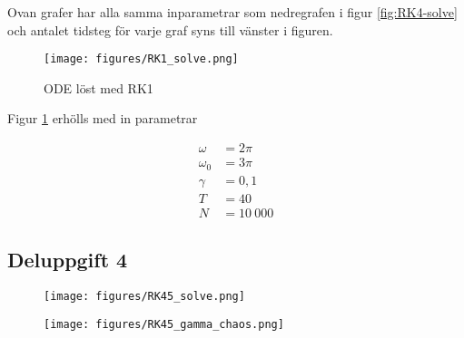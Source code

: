 \documentclass[12pt]{article}
\begin{document}
Ovan grafer har alla samma inparametrar som nedregrafen i figur \ref{fig:RK4-solve} och antalet tidsteg för varje graf syns till vänster i figuren.

\begin{figure}[H]
    \begin{small}
        \begin{center}
            \texttt{[image: figures/RK1\_solve.png]}
        \end{center}
        \caption{ODE löst med RK1}
        \label{fig:RK1-solve}
    \end{small}
\end{figure}

Figur \ref{fig:RK1-solve} erhölls med in parametrar

\begin{align*}
    \omega &= 2 \pi\\
    \omega_0 &= 3 \pi\\
    \gamma &= 0,1\\
    T &= 40\\
    N &= 10 \ 000
\end{align*}

\subsection{Deluppgift 4}

\begin{figure}[H]
    \begin{small}
        \begin{center}
            \texttt{[image: figures/RK45\_solve.png]}
        \end{center}
        \caption{}
        \label{fig:RK45-solve}
    \end{small}
\end{figure}



\begin{figure}[H]
    \begin{small}
        \begin{center}
            \texttt{[image: figures/RK45\_gamma\_chaos.png]}
        \end{center}
        \caption{}
        \label{fig:RK45-chaos}
    \end{small}
\end{figure}
\end{document}
